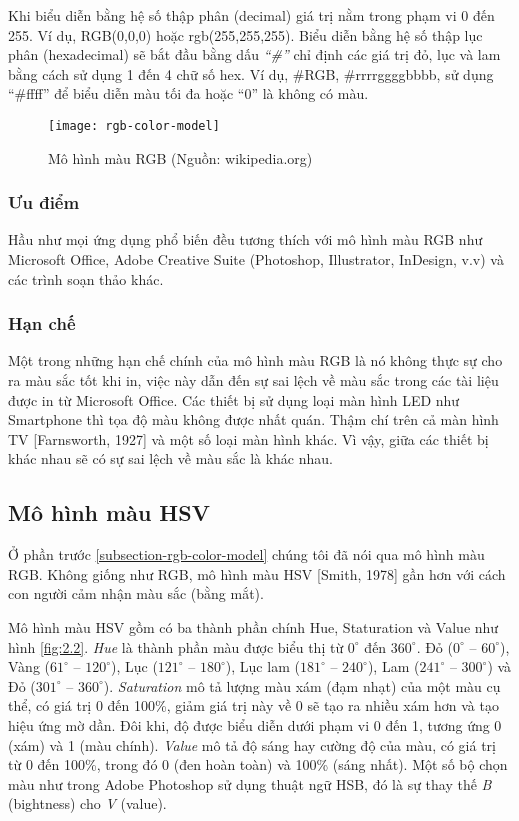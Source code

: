 Khi biểu diễn bằng hệ số thập phân (decimal) giá trị nằm trong phạm vi 0 đến 255. Ví dụ, RGB(0,0,0) hoặc rgb(255,255,255). Biểu diễn bằng hệ số thập lục phân (hexadecimal) sẽ bắt đầu bằng dấu \emph{``\#''} chỉ định các giá trị đỏ, lục và lam bằng cách sử dụng 1 đến 4 chữ số hex. Ví dụ, \#RGB, \#rrrrggggbbbb, sử dụng ``\#ffff'' để biểu diễn màu tối đa hoặc ``0'' là không có màu.\par

\begin{figure}[h]
	\centering
	\texttt{[image: rgb-color-model]}
	\caption[Mô hình màu RGB]{Mô hình màu RGB (Nguồn: wikipedia.org)}
	\label{fig:2.1}
\end{figure}

\subsubsection{Ưu điểm}
Hầu như mọi ứng dụng phổ biến đều tương thích với mô hình màu RGB như Microsoft Office, Adobe Creative Suite (Photoshop, Illustrator, InDesign, v.v) và các trình soạn thảo khác.\par

\subsubsection{Hạn chế}
Một trong những hạn chế chính của mô hình màu RGB là nó không thực sự cho ra màu sắc tốt khi in, việc này dẫn đến sự sai lệch về màu sắc trong các tài liệu được in từ Microsoft Office. Các thiết bị sử dụng loại màn hình LED như Smartphone thì tọa độ màu không được nhất quán. Thậm chí trên cả màn hình TV [Farnsworth, 1927] và một số loại màn hình khác. Vì vậy, giữa các thiết bị khác nhau sẽ có sự sai lệch về màu sắc là khác nhau.\par

\subsection{Mô hình màu HSV}
Ở phần trước \ref{subsection-rgb-color-model} chúng tôi đã nói qua mô hình màu RGB. Không giống như RGB, mô hình màu HSV [Smith, 1978] gần hơn với cách con người cảm nhận màu sắc (bằng mắt).

Mô hình màu HSV gồm có ba thành phần chính Hue, Staturation và Value như hình \ref{fig:2.2}. \emph{Hue} là thành phần màu được biểu thị từ $0^{\circ}$ đến $360^{\circ}$. Đỏ ($0^{\circ}$ -- $60^{\circ}$), Vàng ($61^{\circ}$ -- $120^{\circ}$), Lục ($121^{\circ}$ -- $180^{\circ}$), Lục lam ($181^{\circ}$ -- $240^{\circ}$), Lam ($241^{\circ}$ -- $300^{\circ}$) và Đỏ ($301^{\circ}$ -- $360^{\circ}$). \emph{Saturation} mô tả lượng màu xám (đạm nhạt) của một màu cụ thể, có giá trị 0 đến 100\%, giảm giá trị này về 0 sẽ tạo ra nhiều xám hơn và tạo hiệu ứng mờ dần. Đôi khi, độ được biểu diễn dưới phạm vi 0 đến 1, tương ứng 0 (xám) và 1 (màu chính). \emph{Value} mô tả độ sáng hay cường độ của màu, có giá trị từ 0 đến 100\%, trong đó 0 (đen hoàn toàn) và 100\% (sáng nhất). Một số bộ chọn màu như trong Adobe Photoshop sử dụng thuật ngữ HSB, đó là sự thay thế \emph{B} (bightness) cho \emph{V} (value).

